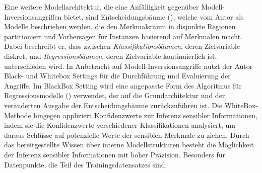 Eine weitere Modellarchitektur, die eine Anfälligkeit gegenüber Modell-Inversionsangriffen bietet, sind Entscheidungsbäume (\cite[S. 4 ff.]{fredrikson_model_2015}), welche vom Autor als Modelle beschrieben werden, die den Merkmalsraum in disjunkte Regionen partitioniert und Vorhersagen für Instanzen basierend auf Merkmalen macht. Dabei beschreibt er, dass zwischen \textit{Klassifikationsbäumen}, deren Zielvariable diskret, und \textit{Regressionsbäumen}, deren Zielvariable kontinuierlich ist, unterschieden wird. In Anbetracht auf Modell-Inversionsangriffe nutzt der Autor Black- und Whitebox Settings für die Durchführung und Evaluierung der Angriffe. Im BlackBox Setting wird eine angepasste Form des Algoritmus für Regressionsmodelle (\cite[21]{fredrikson_privacy_2014}) verwendet, der auf die Grundarchitektur und der veränderten Ausgabe der Entscheidungsbäume zurückzuführen ist. Die WhiteBox-Methode hingegen appliziert Konfidenzwerte zur Inferenz sensibler Informationen, indem sie die Konfidenzwerte verschiedener Klassifikationen analysiert, um daraus Schlüsse auf potenzielle Werte der sensiblen Merkmale zu ziehen. Durch das bereitgestellte Wissen über interne Modellstrukturen besteht die Möglichkeit der Inferenz sensibler Informationen mit hoher Präzision. Besonders für Datenpunkte, die Teil des Trainingsdatensatzes sind. 

